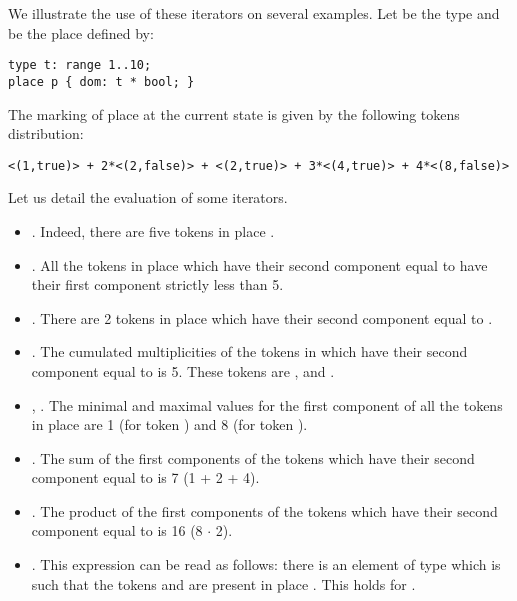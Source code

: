 We illustrate the use of these iterators on several examples.  Let
 be the type and  be the place defined by:
\begin{lstlisting}
type t: range 1..10;
place p { dom: t * bool; }
\end{lstlisting}
The marking of place  at the current state is given by
the following tokens distribution:
\begin{lstlisting}
<(1,true)> + 2*<(2,false)> + <(2,true)> + 3*<(4,true)> + 4*<(8,false)>
\end{lstlisting}
Let us detail the evaluation of some iterators.
\begin{itemize}
\item
{}.
Indeed, there are five tokens in place .
\item
{}.
All the tokens in place  which have their second
component equal to  have their first component
strictly less than 5.
\item
{}.
There are 2 tokens in place  which have their second
component equal to .
\item
{}.
The cumulated multiplicities of the tokens in  which have
their second component equal to  is 5.
These tokens are ,  and
.
\item
{}, .
The minimal and maximal values for the first component of all the
tokens in place  are 1 (for token )
and 8 (for token ).
\item
{}.
The sum of the first components of the tokens which have their second
component equal to  is 7 (1 + 2 + 4).
\item
{}.
The product of the first components of the tokens which have their second
component equal to  is 16 (8 $\cdot$ 2).
\item
{}.
This expression can be read as follows: there is an element
 of type  which is such that the tokens
 and  are present in
place .
This holds for .
\end{itemize}

\iteratordef



